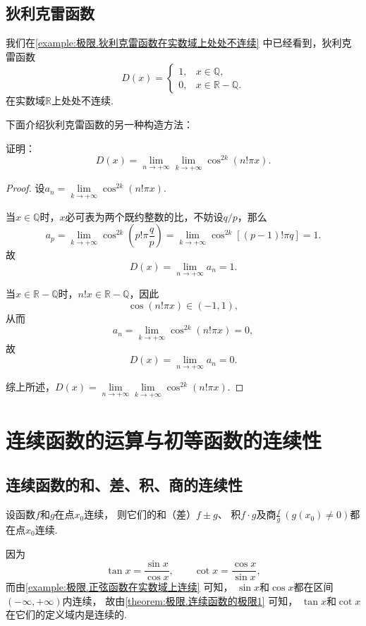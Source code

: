 \subsection{狄利克雷函数}
我们在\cref{example:极限.狄利克雷函数在实数域上处处不连续} 中已经看到，狄利克雷函数\[
D(x) = \left\{ \begin{array}{ll}
1, & x \in \mathbb{Q}, \\
0, & x \in \mathbb{R} - \mathbb{Q}.
\end{array} \right.
\]在实数域\(\mathbb{R}\)上处处不连续.

下面介绍狄利克雷函数的另一种构造方法：
\begin{example}
证明：\[
D(x) = \lim\limits_{n\to+\infty} \lim\limits_{k\to+\infty} \cos^{2k}(n! \pi x).
\]
\begin{proof}
设\(a_n = \lim\limits_{k\to+\infty} \cos^{2k}(n! \pi x)\).

当\(x \in \mathbb{Q}\)时，\(x\)必可表为两个既约整数的比，不妨设\(q/p\)，那么\[
a_p = \lim\limits_{k\to+\infty} \cos^{2k}\left(p! \pi \frac{q}{p}\right)
= \lim\limits_{k\to+\infty} \cos^{2k}[(p-1)! \pi q] = 1.
\]故\[
D(x) = \lim\limits_{n\to+\infty} a_n = 1.
\]

当\(x \in \mathbb{R}-\mathbb{Q}\)时，\(n! x \in \mathbb{R}-\mathbb{Q}\)，因此\[
\cos(n! \pi x) \in (-1,1),
\]从而\[
a_n = \lim\limits_{k\to+\infty} \cos^{2k}(n! \pi x) = 0,
\]故\[
D(x) = \lim\limits_{n\to+\infty} a_n = 0.
\]

综上所述，\(D(x) = \lim\limits_{n\to+\infty} \lim\limits_{k\to+\infty} \cos^{2k}(n! \pi x)\).
\end{proof}
\end{example}

\section{连续函数的运算与初等函数的连续性}
\subsection{连续函数的和、差、积、商的连续性}
\begin{theorem}\label{theorem:极限.连续函数的极限1}
设函数\(f\)和\(g\)在点\(x_0\)连续，
则它们的和（差）\(f \pm g\)、
积\(f \cdot g\)及商\(\frac{f}{g}\ (g(x_0)\neq0)\)都在点\(x_0\)连续.
\end{theorem}

\begin{example}
因为\[
	\tan x=\frac{\sin x}{\cos x}, \qquad
	\cot x=\frac{\cos x}{\sin x},
\]
而由\cref{example:极限.正弦函数在实数域上连续} 可知，
\(\sin x\)和\(\cos x\)都在区间\((-\infty,+\infty)\)内连续，
故由\cref{theorem:极限.连续函数的极限1} 可知，
\(\tan x\)和\(\cot x\)在它们的定义域内是连续的.
\end{example}

